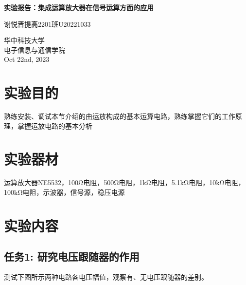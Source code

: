 \documentclass[a4paper,11pt,UTF8]{article}
\begin{document}
	
\begin{titlepage}
	\begin{center}
		\vspace*{1cm}
		\textbf{\Huge 实验报告：集成运算放大器在信号运算方面的应用}
		
		\vspace{0.5cm}
		\Large 谢悦晋\quad 提高2201班\quad U20221033
		
		\vspace{1cm}
		\begin{figure}[H]
			\centering
			\caption*{}
		\end{figure}
		\vfill
		
		
		\vspace{0.8cm}
		华中科技大学 \\
		电子信息与通信学院 \\
		Oct 22nd, 2023
	\end{center}
\end{titlepage}
\tableofcontents
\section{实验目的}
熟练安装、调试本节介绍的由运放构成的基本运算电路，熟练掌握它们的工作原理，掌握运放电路的基本分析
\section{实验器材}
运算放大器NE5532，100$\mathrm{\Omega}$电阻，500$\mathrm{\Omega}$电阻，1$\mathrm{k\Omega}$电阻，5.1$\mathrm{k\Omega}$电阻，10$\mathrm{k\Omega}$电阻，100$\mathrm{k\Omega}$电阻，示波器，信号源，稳压电源
\section{实验内容}
\subsection{任务1: 研究电压跟随器的作用}
测试下图所示两种电路各电压幅值，观察有、无电压跟随器的差别。
\end{document}
